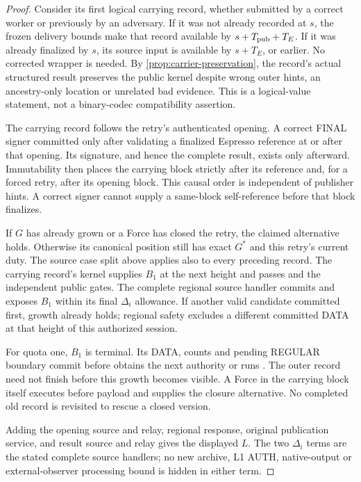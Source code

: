 \begin{proof}
Consider its first logical carrying record, whether submitted by a
correct worker or previously by an adversary. If it was not already
recorded at $s$, the frozen delivery bounds make that record available
by $s+T_{\rm pub}+T_E$. If it was already finalized by $s$, its source
input is available by $s+T_E$, or earlier. No corrected wrapper is
needed. By \cref{prop:carrier-preservation}, the record's actual
structured result preserves the public kernel despite wrong outer
hints, an ancestry-only location or unrelated bad evidence. This is a
logical-value statement, not a binary-codec compatibility assertion.

The carrying record follows the retry's authenticated opening. A
correct FINAL signer committed only after validating a finalized
Espresso reference at or after that opening. Its signature, and hence
the complete result, exists only afterward. Immutability then places
the carrying block strictly after its reference and, for a forced retry,
after its opening block. This causal order is independent of publisher
hints. A correct signer cannot supply a same-block self-reference before
that block finalizes.

If $G$ has already grown or a Force has closed the retry, the claimed
alternative holds. Otherwise its canonical position still has exact
$G^*$ and this retry's current duty. The source case split above applies
also to every preceding record. The carrying record's kernel supplies
$B_1$ at the next height and passes  and the independent
public gates. The complete regional source handler commits and exposes
$B_1$ within its final $\Delta_i$ allowance. If another valid candidate
committed first, growth already holds; regional safety excludes a
different committed DATA at that height of this authorized session.

For quota one, $B_1$ is terminal. Its DATA, counts and pending REGULAR
boundary commit before  obtains the next authority
or runs . The outer record need not finish before this
growth becomes visible. A Force in the carrying block itself executes
before payload and supplies the closure alternative. No completed old
record is revisited to rescue a closed version.

Adding the opening source and relay, regional response, original
publication service, and result source and relay gives the displayed
$L$. The two $\Delta_i$ terms are the stated complete source handlers;
no new archive, L1 AUTH, native-output or external-observer processing
bound is hidden in either term.
\end{proof}


